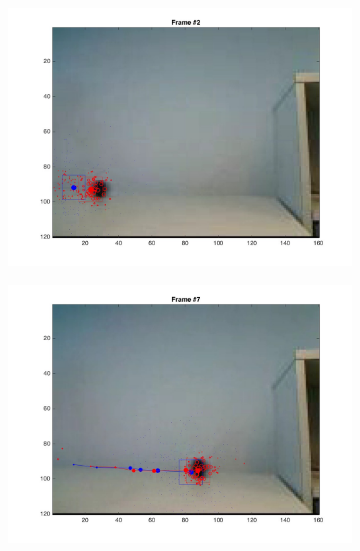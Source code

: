 \documentclass{ethz_report}
\begin{document}
\begin{figure}[h]
    \centering
    \begin{subfigure}[b]{.25\textwidth}
        \centering
        \includegraphics[width=1\linewidth]{images/video3_observe_high_1}
    \end{subfigure}%
    \begin{subfigure}[b]{.25\textwidth}
        \centering
        \includegraphics[width=1\linewidth]{images/video3_observe_high_6}
    \end{subfigure}%
    \begin{subfigure}[b]{.25\textwidth}
        \centering

\end{subfigure}
\end{figure}
\end{document}
